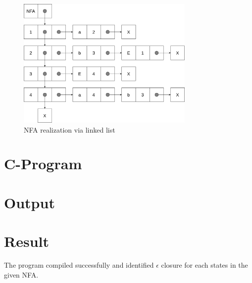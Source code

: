 \begin{figure}[H]
	\centering
	\includegraphics[height=2.5in]{../EXP4/NFA_realization-LinkedList.png}
	\caption{NFA realization via linked list}
\end{figure}
\section{C-Program}


\section{Output}


\section{Result}
The program compiled successfully and identified $\epsilon$ closure for each states in the given NFA.